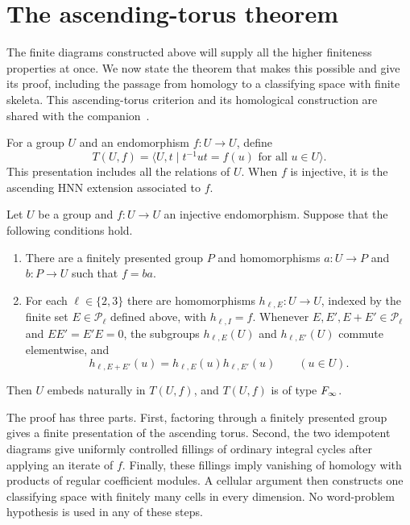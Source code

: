 \section{The ascending-torus theorem}
\label{sec:torus}

The finite diagrams constructed above will supply all the higher
finiteness properties at once.  We now state the theorem that makes
this possible and give its proof, including the passage from homology
to a classifying space with finite skeleta.  This ascending-torus
criterion and its homological construction are shared with the
companion~\cite[Theorem~2.2 and Sections~2.4--2.5]{OpenAIOvergroups}.

For a group $U$ and an endomorphism $f:U\to U$, define
\[
 T(U,f)=\langle U,t\mid t^{-1}ut=f(u)\text{ for all }u\in U\rangle.
\]
This presentation includes all the relations of $U$.  When $f$ is
injective, it is the ascending HNN extension associated to $f$.

\begin{theorem}
\label{thm:torus}
Let $U$ be a group and $f:U\to U$ an injective endomorphism.  Suppose
that the following conditions hold.
\begin{enumerate}[label=\textup{(\roman*)}]
\item There are a finitely presented group $P$ and homomorphisms
      $a:U\to P$ and $b:P\to U$ such that $f=ba$.
\item For each $\ell\in\{2,3\}$ there are homomorphisms
      $h_{\ell,E}:U\to U$, indexed by the finite set
      $E\in\mathcal P_\ell$ defined above, with $h_{\ell,I}=f$.
      Whenever $E,E',E+E'\in\mathcal P_\ell$ and
      $EE'=E'E=0$, the subgroups $h_{\ell,E}(U)$ and
      $h_{\ell,E'}(U)$ commute elementwise, and
      \[
       h_{\ell,E+E'}(u)
          =h_{\ell,E}(u)h_{\ell,E'}(u)
          \qquad(u\in U).
      \]
\end{enumerate}
Then $U$ embeds naturally in $T(U,f)$, and $T(U,f)$ is of type
$F_\infty$.
\end{theorem}

The proof has three parts.  First, factoring through a finitely
presented group gives a finite presentation of the ascending torus.
Second, the two idempotent diagrams give uniformly controlled
fillings of ordinary integral cycles after applying an iterate of
$f$.  Finally, these fillings imply vanishing of homology with
products of regular coefficient modules.  A cellular argument then
constructs one classifying space with finitely many cells in every
dimension.  No word-problem hypothesis is used in any of these steps.

